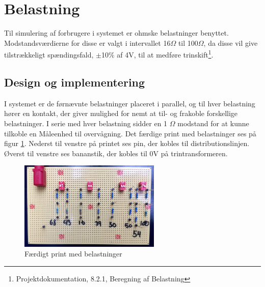 
\section{Belastning}

Til simulering af forbrugere i systemet er ohmske belastninger benyttet. Modstandsværdierne for disse er valgt i intervallet 16$\Omega$ til 100$\Omega$, da disse vil give tilstrækkeligt spændingsfald, $\pm$10$\%$ af 4V, til at medføre trinskift\footnote{Projektdokumentation, 8.2.1, Beregning af Belastning}. 

\subsection{Design og implementering}

I systemet er de førnævnte belastninger placeret i parallel, og til hver belastning hører en kontakt, der giver mulighed for nemt at til- og frakoble forskellige belastninger. I serie med hver belastning sidder en 1 $\Omega$ modstand for at kunne tilkoble en Måleenhed til overvågning. Det færdige print med belastninger ses på figur \ref{fig:Belastning}. Nederst til venstre på printet ses pin, der kobles til distributionslinjen. Øverst til venstre ses bananstik, der kobles til 0V på trintransformeren. 

\begin{figure}[H]
	\centering
	\includegraphics[width=0.6\textwidth]{figure/Belastningskreds}
	\caption{Færdigt print med belastninger}
	\label{fig:Belastning}
\end{figure}